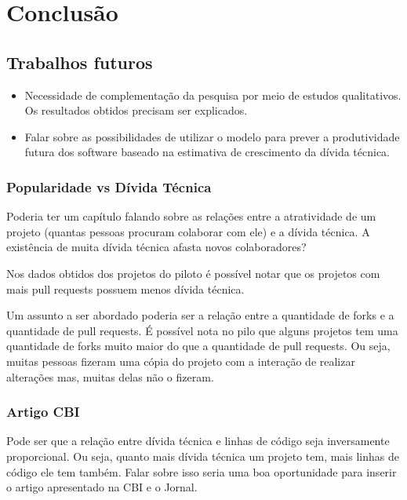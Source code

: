 \chapter{Conclusão}



\section{Trabalhos futuros}

\begin{itemize}
\item Necessidade de complementação da pesquisa por meio de estudos qualitativos. Os resultados obtidos precisam ser explicados.
\item Falar sobre as possibilidades de utilizar o modelo para prever a produtividade futura dos software baseado na estimativa de crescimento da dívida técnica.
\end{itemize}


\subsection{Popularidade vs Dívida Técnica}

Poderia ter um capítulo falando sobre as relações entre a atratividade de um projeto (quantas pessoas procuram colaborar com ele) e a dívida técnica.
A existência de muita dívida técnica afasta novos colaboradores?

Nos dados obtidos dos projetos do piloto é possível notar que os projetos com mais pull requests possuem menos dívida técnica.

Um assunto a ser abordado poderia ser a relação entre a quantidade de forks e a quantidade de pull requests. É possível nota no pilo que alguns projetos tem uma quantidade de forks muito maior do que a quantidade de pull requests. Ou seja, muitas pessoas fizeram uma cópia do projeto com a interação de realizar alterações mas, muitas delas não o fizeram.

\subsection{Artigo CBI}

Pode ser que a relação entre dívida técnica e linhas de código seja inversamente proporcional. Ou seja, quanto mais dívida técnica um projeto tem, mais linhas de código ele tem também. Falar sobre isso seria uma boa oportunidade para inserir o artigo apresentado na CBI e o Jornal.


